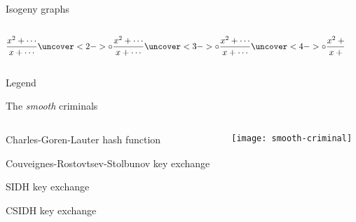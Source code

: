 \documentclass[aspectratio=169]{beamer}
\begin{document}
\begin{frame}{Isogeny graphs}
  \large
  \begin{columns}
    \begin{column}{0.45\textwidth}
      \[
        \frac{x^2 + \cdots}{x + \cdots}
        \uncover<2->{\circ\frac{x^2 + \cdots}{x + \cdots}}
        \uncover<3->{\circ\frac{x^2 + \cdots}{x + \cdots}}
        \uncover<4->{\circ\frac{x^2 + \cdots}{x + \cdots}}
      \]
    \end{column}
    \begin{column}{0.55\textwidth}
      \centering
    \end{column}
  \end{columns}
\end{frame}


\begin{frame}{Legend}
  \large
\end{frame}


\begin{frame}{The \textit{smooth} criminals}
  \Large
  \begin{columns}
    \begin{column}{0.7\textwidth}
      \begin{description}
        \setlength{\itemsep}{1em}
      \item[2006] Charles-Goren-Lauter hash function
      \item[2006] Couveignes-Rostovtsev-Stolbunov key exchange
      \item[2011] SIDH key exchange
      \item[2018] CSIDH key exchange
      \end{description}
    \end{column}
    \begin{column}{0.3\textwidth}
      \texttt{[image: smooth-criminal]}
    \end{column}
  \end{columns}
\end{frame}
\end{document}
